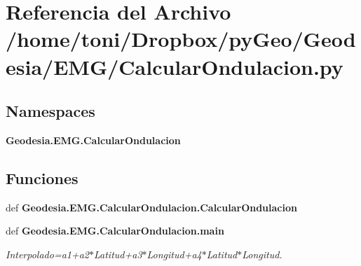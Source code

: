 \section{Referencia del Archivo /home/toni/\-Dropbox/py\-Geo/\-Geodesia/\-E\-M\-G/\-Calcular\-Ondulacion.py}
\label{CalcularOndulacion_8py}
\subsection*{Namespaces}
\begin{DoxyCompactItemize}
\item 
{\bf Geodesia.\-E\-M\-G.\-Calcular\-Ondulacion}
\end{DoxyCompactItemize}
\subsection*{Funciones}
\begin{DoxyCompactItemize}
\item 
def {\bf Geodesia.\-E\-M\-G.\-Calcular\-Ondulacion.\-Calcular\-Ondulacion}
\item 
def {\bf Geodesia.\-E\-M\-G.\-Calcular\-Ondulacion.\-main}
\begin{DoxyCompactList}\small\item\em Interpolado=a1+a2$\ast$\-Latitud+a3$\ast$\-Longitud+a4$\ast$\-Latitud$\ast$\-Longitud. \end{DoxyCompactList}\end{DoxyCompactItemize}
